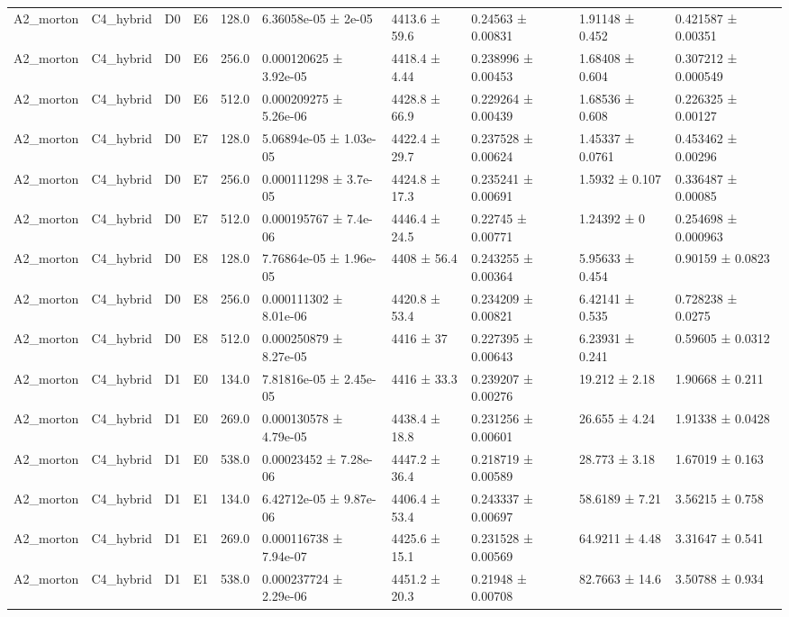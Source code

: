 \begin{table}
\begin{tabular}{llllllllll}
A2\_morton & C4\_hybrid & D0 & E6 & 128.0 & 6.36058e-05 ± 2e-05 & 4413.6 ± 59.6 & 0.24563 ± 0.00831 & 1.91148 ± 0.452 & 0.421587 ± 0.00351 \\
A2\_morton & C4\_hybrid & D0 & E6 & 256.0 & 0.000120625 ± 3.92e-05 & 4418.4 ± 4.44 & 0.238996 ± 0.00453 & 1.68408 ± 0.604 & 0.307212 ± 0.000549 \\
A2\_morton & C4\_hybrid & D0 & E6 & 512.0 & 0.000209275 ± 5.26e-06 & 4428.8 ± 66.9 & 0.229264 ± 0.00439 & 1.68536 ± 0.608 & 0.226325 ± 0.00127 \\
A2\_morton & C4\_hybrid & D0 & E7 & 128.0 & 5.06894e-05 ± 1.03e-05 & 4422.4 ± 29.7 & 0.237528 ± 0.00624 & 1.45337 ± 0.0761 & 0.453462 ± 0.00296 \\
A2\_morton & C4\_hybrid & D0 & E7 & 256.0 & 0.000111298 ± 3.7e-05 & 4424.8 ± 17.3 & 0.235241 ± 0.00691 & 1.5932 ± 0.107 & 0.336487 ± 0.00085 \\
A2\_morton & C4\_hybrid & D0 & E7 & 512.0 & 0.000195767 ± 7.4e-06 & 4446.4 ± 24.5 & 0.22745 ± 0.00771 & 1.24392 ± 0 & 0.254698 ± 0.000963 \\
A2\_morton & C4\_hybrid & D0 & E8 & 128.0 & 7.76864e-05 ± 1.96e-05 & 4408 ± 56.4 & 0.243255 ± 0.00364 & 5.95633 ± 0.454 & 0.90159 ± 0.0823 \\
A2\_morton & C4\_hybrid & D0 & E8 & 256.0 & 0.000111302 ± 8.01e-06 & 4420.8 ± 53.4 & 0.234209 ± 0.00821 & 6.42141 ± 0.535 & 0.728238 ± 0.0275 \\
A2\_morton & C4\_hybrid & D0 & E8 & 512.0 & 0.000250879 ± 8.27e-05 & 4416 ± 37 & 0.227395 ± 0.00643 & 6.23931 ± 0.241 & 0.59605 ± 0.0312 \\
A2\_morton & C4\_hybrid & D1 & E0 & 134.0 & 7.81816e-05 ± 2.45e-05 & 4416 ± 33.3 & 0.239207 ± 0.00276 & 19.212 ± 2.18 & 1.90668 ± 0.211 \\
A2\_morton & C4\_hybrid & D1 & E0 & 269.0 & 0.000130578 ± 4.79e-05 & 4438.4 ± 18.8 & 0.231256 ± 0.00601 & 26.655 ± 4.24 & 1.91338 ± 0.0428 \\
A2\_morton & C4\_hybrid & D1 & E0 & 538.0 & 0.00023452 ± 7.28e-06 & 4447.2 ± 36.4 & 0.218719 ± 0.00589 & 28.773 ± 3.18 & 1.67019 ± 0.163 \\
A2\_morton & C4\_hybrid & D1 & E1 & 134.0 & 6.42712e-05 ± 9.87e-06 & 4406.4 ± 53.4 & 0.243337 ± 0.00697 & 58.6189 ± 7.21 & 3.56215 ± 0.758 \\
A2\_morton & C4\_hybrid & D1 & E1 & 269.0 & 0.000116738 ± 7.94e-07 & 4425.6 ± 15.1 & 0.231528 ± 0.00569 & 64.9211 ± 4.48 & 3.31647 ± 0.541 \\
A2\_morton & C4\_hybrid & D1 & E1 & 538.0 & 0.000237724 ± 2.29e-06 & 4451.2 ± 20.3 & 0.21948 ± 0.00708 & 82.7663 ± 14.6 & 3.50788 ± 0.934 \\

\end{tabular}
\end{table}
